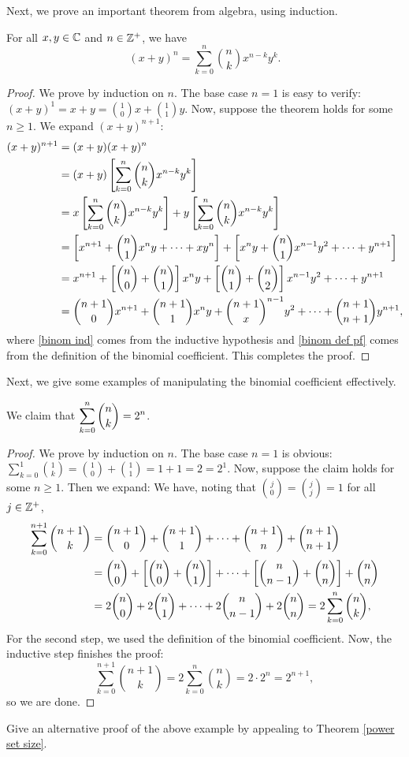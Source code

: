\documentclass{article}
\begin{document}
Next, we prove an important theorem from algebra, using induction.
\begin{theorem}\label{binomial theorem}
For all $x,y\in\mathbb C$ and $n\in \mathbb Z^+$, we have
$$(x+y)^n = \sum_{k=0}^n \binom nk x^{n-k}y^k.$$
\end{theorem}
\begin{proof}
We prove by induction on $n$. The base case $n=1$ is easy to verify: $(x+y)^1 = x+y = \binom 10 x + \binom 11 y$. Now, suppose the theorem holds for some $n \geq 1$. We expand $(x+y)^{n+1}$:
\begin{align}
    (x+y)^{n+1} &= (x+y)(x+y)^n \\
    &= (x+y)\left[\sum_{k=0}^n \binom nkx^{n-k}y^k\right] \label{binom ind} \\
    &= x\left[\sum_{k=0}^n \binom nkx^{n-k}y^k\right] + y \left[\sum_{k=0}^n \binom nkx^{n-k}y^k\right] \\
    &= \left[x^{n+1}+\binom n1x^ny +\cdots  + xy^n\right]  +\left[x^ny + \binom n1 x^{n-1}y^2 +\cdots+ y^{n+1}\right] \\
    &= x^{n+1} + \left[\binom n0 + \binom n1\right]x^ny + \left[\binom n1+\binom n2\right]x^{n-1}y^2 + \cdots + y^{n+1} \\
    &= \binom{n+1}0 x^{n+1} + \binom{n+1}1 x^ny + \binom{n+1}x^{n-1}y^2 + \cdots + \binom{n+1}{n+1}y^{n+1}, \label{binom def pf}
    \end{align}
where \eqref{binom ind} comes from the inductive hypothesis and \eqref{binom def pf} comes from the definition of the binomial coefficient. This completes the proof.
\end{proof}

Next, we give some examples of manipulating the binomial coefficient effectively.
\begin{example}
We claim that $\displaystyle\sum_{k=0}^n \binom nk = 2^n$.
\end{example}
\begin{proof}
We prove by induction on $n$. The base case $n=1$ is obvious: $\sum_{k=0}^1 \binom 1k = \binom 10 + \binom 11 = 1+1=2=2^1$. Now, suppose the claim holds for some $n\geq 1$. Then we expand:
\newpage
We have, noting that $\binom j0 = \binom jj = 1$ for all $j\in\mathbb Z^+$,
\begin{align*}
    \sum_{k=0}^{n+1}\binom{n+1}k &= \binom{n+1}0 + \binom{n+1}1 + \cdots + \binom{n+1}n + \binom{n+1}{n+1} \\
    &= \binom n0 + \left[\binom n0 + \binom n1\right] + \cdots + \left[\binom{n}{n-1} + \binom nn\right] + \binom nn \\
    &= 2\binom n0 + 2\binom n1 + \cdots + 2\binom n{n-1} + 2\binom nn = 2\sum_{k=0}^{n}\binom nk,
\end{align*}
For the second step, we used the definition of the binomial coefficient. Now, the inductive step finishes the proof:
$$\sum_{k=0}^{n+1} \binom{n+1}k = 2\sum_{k=0}^n \binom nk = 2\cdot 2^n = 2^{n+1},$$
so we are done.
\end{proof}
\begin{exercise}
Give an alternative proof of the above example by appealing to Theorem \ref{power set size}.
\end{exercise}
\end{document}
